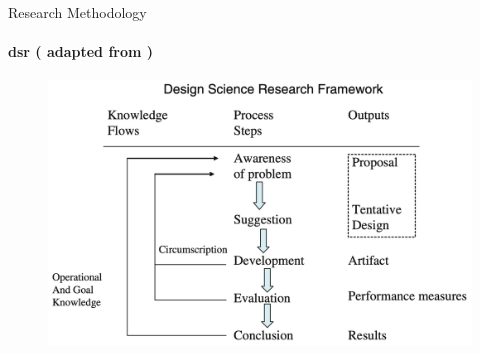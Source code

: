 \begin{tframe}{Research Methodology}
\framesubtitle{\acrlong{dsr} (\textcite{Hevner2010} adapted from \textcite{Vaishnavi2007})}
    \begin{figure}[htbp]
        \centering
        \includegraphics[width=.8\textwidth]{../img/research-design/design-science-research-framework.png}
    \end{figure}
\end{tframe}